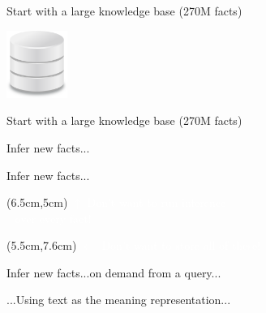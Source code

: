 \begin{frame}{Start with a large knowledge base (270M facts)}
\begin{center}
  \hspace{0.8cm}
  \includegraphics[height=2.2cm]{../img/database.png}
\end{center}
\end{frame}

\begin{frame}[noframenumbering]{Start with a large knowledge base (270M facts)}
\begin{center}
  \teaserManyPremises
\end{center}
\end{frame}

\begin{frame}[noframenumbering]{Infer new facts...}
\begin{center}
  \teaserBlindInferenceNaturalOrderBlind
\end{center}
\end{frame}

\begin{frame}[noframenumbering]{Infer new facts...}
\begin{center}
  \teaserBlindInferenceNaturalOrder
\end{center}
\pause
\begin{textblock*}{6.0cm}(6.5cm,5cm)
  \textcolor<1-1>{white}{$\uparrow$ Don't want to run inference \\ $~~$ over every fact!}
\end{textblock*}
\pause
\begin{textblock*}{6cm}(5.5cm,7.6cm)
  \textcolor<1-2>{white}{$\leftarrow$ Don't want to store all of these!}
\end{textblock*}
\end{frame}

\begin{frame}[noframenumbering]{Infer new facts...on demand from a query...}
\begin{center}
  \teaserBlindInference
\end{center}
\end{frame}

\begin{frame}[noframenumbering]{...Using text as the meaning representation...}
\begin{center}
  \teaserInference
\end{center}
\end{frame}

